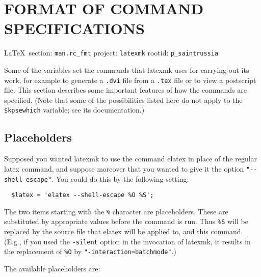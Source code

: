  
 

\clearpage
\section{FORMAT OF COMMAND SPECIFICATIONS}
  
\vspace{0.5cm}
 {\ifDEBUG\small\LaTeX~section: \verb|man.rc_fmt| project: \verb|latexmk| rootid: \verb|p_saintrussia| \fi}
\vspace{0.5cm}
  

Some of the variables set the commands that latexmk uses  for  carrying out
its  work, for example to generate a \verb|.dvi| file from a \verb|.tex| file
or to view a postscript file.  This section describes some important  features
of how the commands are specified.  (Note that some of the possibilities listed
here do not apply to the \verb|$kpsewhich| variable;  see  its documentation.)

\subsection{Placeholders}

Supposed you wanted latexmk to use the command elatex in place
of the regular latex  command,  and  suppose  moreover  that  you wanted  to
give  it the option \verb|"--shell-escape"|.  You could do this by the
following setting:

\begin{verbatim}
  $latex = 'elatex --shell-escape %O %S';
\end{verbatim}

The two items starting with the \verb|%| character  are  placeholders.   These
are  substituted by appropriate values before the command is run.  Thus
\verb|%S| will be replaced by the source file that elatex will be applied to,
and  %
this command.  (E.g., if you used the \verb|-silent| option in the invocation
of  latexmk,   it  results in the replacement of \verb|%O| by
\verb|"-interaction=batchmode"|.)

The available placeholders are:

